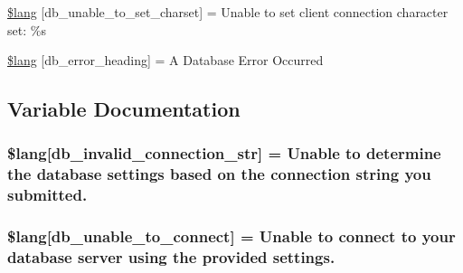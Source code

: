 \begin{DoxyCompactItemize}
\item 
\hyperlink{system_2language_2english_2db__lang_8php_ab22396948e25460833329cb8786ad831}{\$lang} \mbox{[}\textquotesingle{}db\+\_\+unable\+\_\+to\+\_\+set\+\_\+charset\textquotesingle{}\mbox{]} = \textquotesingle{}Unable to set client connection character set\+: \%s\textquotesingle{}
\item 
\hyperlink{system_2language_2english_2db__lang_8php_a4be34cea2490b0d41689b65e52286658}{\$lang} \mbox{[}\textquotesingle{}db\+\_\+error\+\_\+heading\textquotesingle{}\mbox{]} = \textquotesingle{}A Database Error Occurred\textquotesingle{}
\end{DoxyCompactItemize}


\subsection{Variable Documentation}
\hypertarget{system_2language_2english_2db__lang_8php_a0c2ed2613101d37cbaba14042530c16d}{}
\subsubsection[{\$lang}]{\setlength{\rightskip}{0pt plus 5cm}\$lang\mbox{[}\textquotesingle{}db\+\_\+invalid\+\_\+connection\+\_\+str\textquotesingle{}\mbox{]} = \textquotesingle{}Unable to determine the database settings based {\bf on} the connection string you submitted.\textquotesingle{}}\label{system_2language_2english_2db__lang_8php_a0c2ed2613101d37cbaba14042530c16d}
\hypertarget{system_2language_2english_2db__lang_8php_aa5935b86c957eb15ac7d41cf84143d66}{}
\subsubsection[{\$lang}]{\setlength{\rightskip}{0pt plus 5cm}\$lang\mbox{[}\textquotesingle{}db\+\_\+unable\+\_\+to\+\_\+connect\textquotesingle{}\mbox{]} = \textquotesingle{}Unable to connect to your database server using the provided settings.\textquotesingle{}}\label{system_2language_2english_2db__lang_8php_aa5935b86c957eb15ac7d41cf84143d66}
\hypertarget{system_2language_2english_2db__lang_8php_a3c93974df838c0e036690874108715ea}{}

